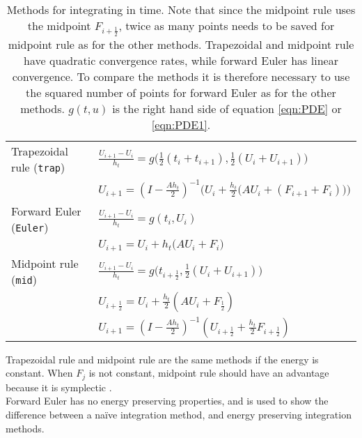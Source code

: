 \begin{table}

\caption{Methods for integrating in time. Note that since the midpoint rule uses the midpoint $F_{i+\frac{1}{2}}$, twice as many points needs to be saved for midpoint rule as for the other methods. Trapezoidal and midpoint rule have quadratic convergence rates, while forward Euler has linear convergence. To compare the methods it is therefore necessary to use the squared number of points for forward Euler as for the other methods. $g(t,u)$ is the right hand side of equation \eqref{eqn:PDE} or \eqref{eqn:PDE1}.}
\centering
\begin{tabular}{l l}
	Trapezoidal rule (\texttt{trap}) \cite{trapezoidal} & $ \frac{U_{i+1} - U_{i}}{h_t} = g \Big( \frac{1}{2}(t_i+t_{i+1}),\frac{1}{2}(U_i+U_{i+1}) \Big)$
	\\ & $U_{i+1} = (I- \frac{A h_t}{2}) ^{-1} \Big(  U_i + \frac{h_t}{2} \big( A U_i+(F_{i+1}+F_i) \big)  \Big) $\\
\hline	
	Forward Euler (\texttt{Euler}) \cite{forwardeuler} & $ \frac{U_{i+1} - U_{i}}{h_t} = g ( t_i, U_i ) $ \\ & $ U_{i+1} = U_i + h_t \big( A U_i + F_i \big) $ \\
	\hline
	Midpoint rule (\texttt{mid}) \cite{midpoint} & $ \frac{U_{i+1} - U_{i}}{h_t} =  g \Big(  t_{i+\frac{1}{2}} , \frac{1}{2}(U_i + U_{i+1})    \Big) $ \\ & 
	$U_{i+\frac{1}{2}} = U_i + \frac{h_t}{2} ( A U_i + F_{\frac{1}{2}} )$ \\ &
    $U_{i+1} = (I-\frac{A h_t}{2}) ^{-1} (U_{i+\frac{1}{2}} + \frac{h_t}{2} F_{i+ \frac{1}{2}})$
    
    
\end{tabular}


\label{tab:intmet}
\end{table}
\noindent Trapezoidal rule and midpoint rule are the same methods if the energy is constant. When $F_j$  is not constant, midpoint rule should have an advantage because it is symplectic \cite{symplecticintegrator}. \\

\noindent Forward Euler has no energy preserving properties, and is used to show the difference between a naïve integration method, and energy preserving integration methods. \\

